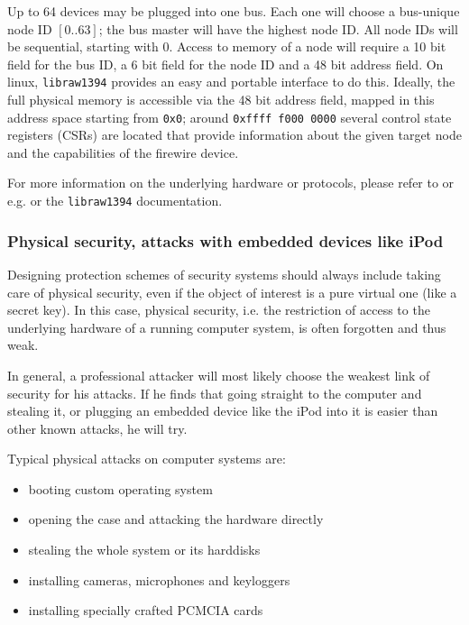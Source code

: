 Up to 64 devices may be plugged into one bus. Each one will choose a bus-unique
node ID $[0..63]$; the bus master will have the highest node ID. All node IDs
will be sequential, starting with 0. Access to memory of a node will require a
10 bit field for the bus ID, a 6 bit field for the node ID and a 48 bit address
field.  On linux, \texttt{libraw1394} provides an easy and portable interface to
do this. Ideally, the full physical memory is accessible via the 48 bit address
field, mapped in this address space starting from \texttt{0x0}; around
\texttt{0xffff~f000~0000} several control state registers (CSRs) are located
that provide information about the given target node and the capabilities of the
firewire device.

For more information on the underlying hardware or protocols, please refer to
\cite{OHCIspecs:2000} or e.g. \cite{fwire_sys_arch:2222} or the
\texttt{libraw1394} documentation.



\subsubsection{Physical security, attacks with embedded devices like iPod}

Designing protection schemes of security systems should always include taking
care of physical security, even if the object of interest is a pure virtual one
(like a secret key). In this case, physical security, i.e. the restriction of
access to the underlying hardware of a running computer system, is often
forgotten and thus weak.

In general, a professional attacker will most likely choose the weakest link of
security for his attacks. If he finds that going straight to the computer and
stealing it, or plugging an embedded device like the iPod into it is easier than
other known attacks, he will try.

Typical physical attacks on computer systems are:

\begin{itemize}

	\item booting custom operating system

	\item opening the case and attacking the hardware directly

	\item stealing the whole system or its harddisks

	\item installing cameras, microphones and keyloggers

	\item installing specially crafted PCMCIA cards

\end{itemize}

